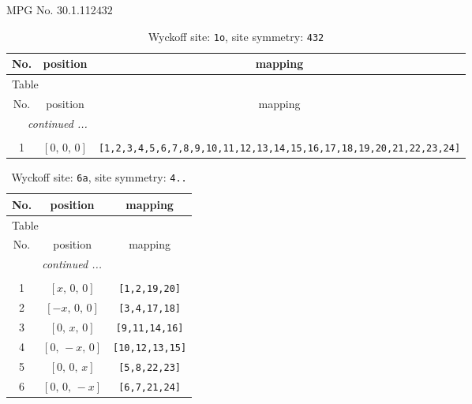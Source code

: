 \documentclass[fleqn,8pt]{jsarticle}
\begin{document}
\setcounter{MaxMatrixCols}{32}

\renewcommand{\tablename}{Table~}
\renewcommand{\figurename}{Figure~}
\begin{center}
\LARGE
MPG No. 30.1.112\quad$432$
\end{center}
\renewcommand{\arraystretch}{1.2}
\begin{longtable}{ccc}
\caption{Wyckoff site: {\tt 1o}, site symmetry: {\tt 432}}
 \\
 \hline \hline
No. & position & mapping \\ \hline \endfirsthead

\multicolumn{2}{l}{\tablename\ \thetable{}} \\
 \hline \hline
No. & position & mapping \\ \hline \endhead

 \hline \hline
\multicolumn{2}{r}{\footnotesize\it continued ...} \\ \endfoot

 \hline \hline
\multicolumn{2}{r}{} \\ \endlastfoot

1 & $\left[ 0,\, 0,\, 0 \right]$ & {\tt [1,2,3,4,5,6,7,8,9,10,11,12,13,14,15,16,17,18,19,20,21,22,23,24]} \\
\end{longtable}
\renewcommand{\arraystretch}{1.2}
\begin{longtable}{ccc}
\caption{Wyckoff site: {\tt 6a}, site symmetry: {\tt 4..}}
 \\
 \hline \hline
No. & position & mapping \\ \hline \endfirsthead

\multicolumn{2}{l}{\tablename\ \thetable{}} \\
 \hline \hline
No. & position & mapping \\ \hline \endhead

 \hline \hline
\multicolumn{2}{r}{\footnotesize\it continued ...} \\ \endfoot

 \hline \hline
\multicolumn{2}{r}{} \\ \endlastfoot

1 & $\left[ x,\, 0,\, 0 \right]$ & {\tt [1,2,19,20]} \\ \hline
2 & $\left[ - x,\, 0,\, 0 \right]$ & {\tt [3,4,17,18]} \\ \hline
3 & $\left[ 0,\, x,\, 0 \right]$ & {\tt [9,11,14,16]} \\ \hline
4 & $\left[ 0,\, - x,\, 0 \right]$ & {\tt [10,12,13,15]} \\ \hline
5 & $\left[ 0,\, 0,\, x \right]$ & {\tt [5,8,22,23]} \\ \hline
6 & $\left[ 0,\, 0,\, - x \right]$ & {\tt [6,7,21,24]} \\
\end{longtable}
\end{document}
